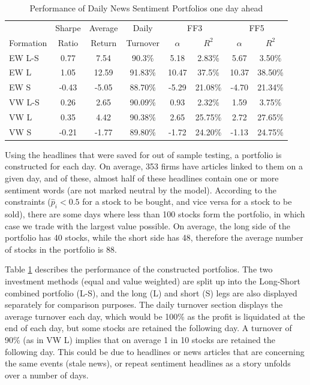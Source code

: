 \begin{table}[!ht]
\begin{center}
\begin{tabular}{lccccccc}
      \toprule
      & Sharpe &  Average & Daily & \multicolumn{2}{c}{FF3} & \multicolumn{2}{c}{FF5} \\
      \cmidrule(lr){5-6}
      \cmidrule(lr){7-8}
      Formation & Ratio & Return & Turnover & $\alpha$ & $R^2$ & $\alpha$ & $R^2$ \\
      \midrule
      EW L-S& 0.77 & 7.54 & 90.3\% & 5.18 & 2.83\% & 5.67 & 3.50\% \\
      EW L  & 1.05 & 12.59 & 91.83\% & 10.47 & 37.5\% & 10.37 & 38.50\% \\
      EW S  & -0.43 & -5.05 & 88.70\% & -5.29 & 21.08\% & -4.70 & 21.34\% \\
      VW L-S& 0.26 & 2.65 & 90.09\% & 0.93 & 2.32\% & 1.59 & 3.75\% \\
      VW L  & 0.35 & 4.42 & 90.38\% & 2.65 & 25.75\% & 2.72 & 27.65\% \\
      VW S  & -0.21 & -1.77 & 89.80\% & -1.72 & 24.20\% & -1.13 & 24.75\%\\
      \bottomrule
\end{tabular}
\caption{Performance of Daily News Sentiment Portfolios one day ahead}
\label{portfolio-performance}
\end{center}
\end{table}


Using the headlines that were saved for out of sample testing, a portfolio is constructed for each day. On average, 353 firms have articles linked to them on a given day, and of these, almost half of these headlines contain one or more sentiment words (are not marked neutral by the model). According to the constraints ($\widehat p_i < 0.5$ for a stock to be bought, and vice versa for a stock to be sold), there are some days where less than 100 stocks form the portfolio, in which case we trade with the largest value possible. On average, the long side of the portfolio has 40 stocks, while the short side has 48, therefore the average number of stocks in the portfolio is 88.

Table \ref{portfolio-performance} describes the performance of the constructed portfolios. The two investment methods (equal and value weighted) are split up into the Long-Short combined portfolio (L-S), and the long (L) and short (S) legs are also displayed separately for comparison purposes. The daily turnover section displays the average turnover each day, which would be 100\% as the profit is liquidated at the end of each day, but some stocks are retained the following day. A turnover of 90\% (as in VW L) implies that on average 1 in 10 stocks are retained the following day. This could be due to headlines or news articles that are concerning the same events (stale news), or repeat sentiment headlines as a story unfolds over a number of days.

